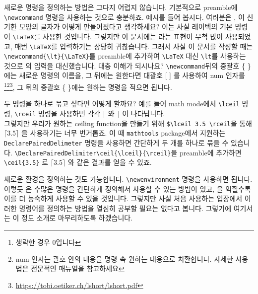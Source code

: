 새로운 명령을 정의하는 방법은 그다지 어렵지 않습니다.
기본적으로 preamble에 \verb|\newcommand| 명령을 사용하는 것으로 충분하죠.
예시를 들어 봅시다.
여러분은 \lt, 이 신기한 모양의 글자가 어떻게 만들어졌다고 생각하세요?
이는 사실 레이텍의 기본 명령어 \verb|\LaTeX|를 사용한 것입니다.
그렇지만 이 문서에는 \lt 라는 표현이 무척 많이 사용되었고, 매번 \verb|\LaTeX|를 입력하기는 상당히 귀찮습니다.
그래서 사실 이 문서를 작성할 때는 \verb|\newcommand{\lt}{\LaTeX}|를 preamble에 추가하여 \verb|\LaTeX| 대신 \verb|\lt|를 사용하는 것으로 \lt 의 입력을 대신했습니다.
대충 이해가 되시나요?
\verb|\newcommand|뒤의 중괄호 \{ \}에는 새로운 명령의 이름을, 그 뒤에는 원한다면 대괄호 [ ] 를 사용하여 num 인자를\footnote{생략한 경우 0입니다}\footnote{num 인자는 괄호 안의 내용을 명령 속 원하는 내용으로 치환합니다. 자세한 사용법은 전문적인 매뉴얼을 참고하세요}\footnote{\url{https://tobi.oetiker.ch/lshort/lshort.pdf}}, 그 뒤의 중괄호 \{ \}에는 원하는 명령을 적으면 됩니다.

두 명령을 하나로 묶고 싶다면 어떻게 할까요?
예를 들어 math mode에서 \verb|\lceil| 명령, \verb|\rceil| 명령을 사용하면 각각 $\lceil$ 와 $\rceil$ 이 나타납니다. \\
그렇지만 우리가 원하는 ceiling function을 만들기 위해 \verb|$\lceil 3.5 \rceil|을 통해 $\lceil 3.5 \rceil$ 을 사용하기는 너무 번거롭죠.
이 때 \verb|mathtools| package에서 지원하는 \verb|DeclarePairedDelimeter| 명령을 사용하면 간단하게 두 개를 하나로 묶을 수 있습니다.
\verb|\DeclarePairedDelimiter\ceil{\lceil}{\rceil}|을 preamble에 추가하면 \verb|\ceil{3.5}| 로 $\lceil 3.5 \rceil$ 와 같은 결과를 얻을 수 있죠. 

새로운 환경을 정의하는 것도 가능합니다.
\verb|\newenvironment| 명령을 사용하면 됩니다.
이렇듯 \lt 은 수많은 명령을 간단하게 정의해서 사용할 수 있는 방법이 있고, \lt 을 익힐수록 이를 더 능숙하게 사용할 수 있을 것입니다.
그렇지만 사실 처음 사용하는 입장에서 이러한 명령어를 정의하는 방법을 열심히 공부할 필요는 없다고 봅니다.
그렇기에 여기서는 이 정도 소개로 마무리하도록 하겠습니다.

















